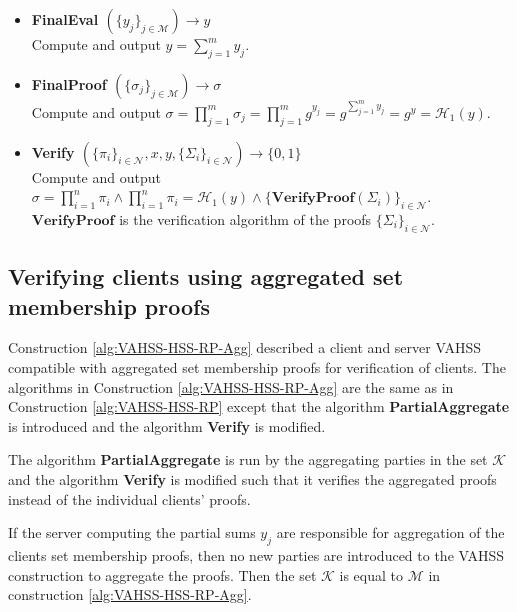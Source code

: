 \begin{algorithm}
\begin{itemize}
\item\textbf{FinalEval $(\{y_j\}_{j\in\mathcal{M}})\xrightarrow[]{}y$}\\
Compute and output $y = \sum_{j=1}^m y_{j}$.

\item\textbf{FinalProof $(\{\sigma_j\}_{j\in\mathcal{M}})\xrightarrow[]{}\sigma$}\\
Compute and output $\sigma = \prod_{j=1}^m \sigma_j = \prod_{j=1}^m g^{y_{j}} =  g^{\sum_{j=1}^m y_{j}}= g^{y}=\mathcal{H}_1(y)$.

\item\textbf{Verify $(\{\pi_i\}_{i\in\mathcal{N}},x,y,\{\Sigma_i\}_{i\in\mathcal{N}})\xrightarrow[]{}\{0,1\}$}\\
Compute and output $\sigma= \prod_{i=1}^n \pi_i \wedge \prod_{i=1}^n \pi_i = \mathcal{H}_1(y)\wedge \{\textbf{VerifyProof}( \Sigma_i) \}_{i\in\mathcal{N}}$. $\textbf{VerifyProof}$ is the verification algorithm of  the  proofs $\{\Sigma_i\}_{i\in\mathcal{N}}$.
\end{itemize}
\label{alg:VAHSS-HSS-RP}
\end{algorithm}

\subsection*{Verifying clients using aggregated set membership proofs}
Construction \ref{alg:VAHSS-HSS-RP-Agg} described a client and server VAHSS compatible with aggregated set membership proofs for verification of clients. The algorithms in Construction \ref{alg:VAHSS-HSS-RP-Agg} are the same as in Construction \ref{alg:VAHSS-HSS-RP} except that the algorithm \textbf{PartialAggregate} is introduced and the algorithm \textbf{Verify} is modified. 

The algorithm \textbf{PartialAggregate} is run by the aggregating parties in the set $\mathcal{K}$ and the algorithm \textbf{Verify} is modified such that it verifies the aggregated proofs instead of the individual clients' proofs.

If the server computing the partial sums $y_j$ are responsible for aggregation of the clients set membership proofs, then no new parties are introduced to the VAHSS construction to aggregate the proofs.  Then the set $\mathcal{K}$ is equal to $\mathcal{M}$ in construction \ref{alg:VAHSS-HSS-RP-Agg}. 
 
